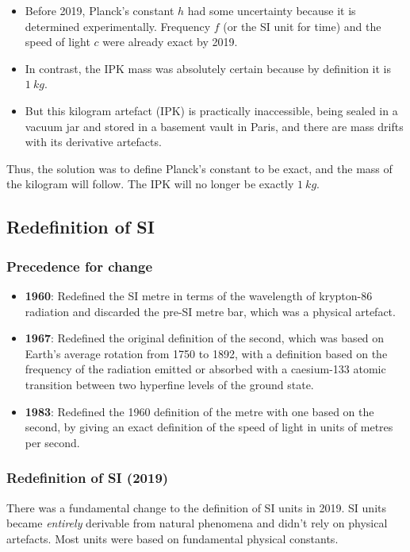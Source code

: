 \documentclass[11pt]{article}
\begin{document}
\begin{itemize}
\item Before 2019, Planck's constant \(h\) had some uncertainty because it is determined experimentally. Frequency \(f\) (or the SI unit for time) and the speed of light \(c\) were already exact by 2019.
\item In contrast, the IPK mass was absolutely certain because by definition it is \(\qty{1}{kg}\).
\item But this kilogram artefact (IPK) is practically inaccessible, being sealed in a vacuum jar and stored in a basement vault in Paris, and there are mass drifts with its derivative artefacts.
\end{itemize}

Thus, the solution was to define Planck's constant to be exact, and the mass of the kilogram will follow. The IPK will no longer be exactly \(\qty{1}{kg}\).


\subsection{Redefinition of SI}
\label{sec:org6cc8914}

\subsubsection{Precedence for change}
\label{sec:org2b94e54}
\begin{itemize}
\item \textbf{1960}: Redefined the SI metre in terms of the wavelength of krypton-86 radiation and discarded the pre-SI metre bar, which was a physical artefact.
\item \textbf{1967}: Redefined the original definition of the second, which was based on Earth's average rotation from 1750 to 1892, with a definition based on the frequency of the radiation emitted or absorbed with a caesium-133 atomic transition between two hyperfine levels of the ground state.
\item \textbf{1983}: Redefined the 1960 definition of the metre with one based on the second, by giving an exact definition of the speed of light in units of metres per second.
\end{itemize}

\subsubsection{Redefinition of SI (2019)}
\label{sec:org88b1483}
There was a fundamental change to the definition of SI units in 2019. SI units became \emph{entirely} derivable from natural phenomena and didn't rely on physical artefacts. Most units were based on fundamental physical constants.
\end{document}

